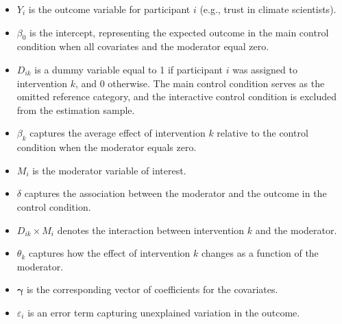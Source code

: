 \documentclass[
  letterpaper,
  DIV=11,
  numbers=noendperiod]{scrartcl}
\providecommand{\tightlist}{%
  \setlength{\itemsep}{0pt}\setlength{\parskip}{0pt}}
\begin{document}
\begin{itemize}
\tightlist
\item
  \(Y_i\) is the outcome variable for participant \(i\) (e.g., trust in
  climate scientists).
\item
  \(\beta_0\) is the intercept, representing the expected outcome in the
  main control condition when all covariates and the moderator equal
  zero.
\item
  \(D_{ik}\) is a dummy variable equal to 1 if participant \(i\) was
  assigned to intervention \(k\), and 0 otherwise. The main control
  condition serves as the omitted reference category, and the
  interactive control condition is excluded from the estimation sample.
\item
  \(\beta_k\) captures the average effect of intervention \(k\) relative
  to the control condition when the moderator equals zero.
\item
  \(M_i\) is the moderator variable of interest.
\item
  \(\delta\) captures the association between the moderator and the
  outcome in the control condition.
\item
  \(D_{ik} \times M_i\) denotes the interaction between intervention
  \(k\) and the moderator.
\item
  \(\theta_k\) captures how the effect of intervention \(k\) changes as
  a function of the moderator.
\item
  \(\boldsymbol{\gamma}\) is the corresponding vector of coefficients
  for the covariates.
\item
  \(\varepsilon_i\) is an error term capturing unexplained variation in
  the outcome.
\end{itemize}
\end{document}
